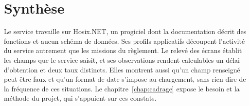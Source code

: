 \section*{Synthèse}

Le service travaille sur Hosix.NET, un progiciel dont la documentation décrit des fonctions et aucun
schéma de données. Ses  profils applicatifs découpent l'activité du service autrement que les
missions du règlement. Le relevé des écrans établit les champs que le service saisit, et ses
observations rendent calculables un délai d'obtention et deux taux distincts. Elles montrent aussi
qu'un champ renseigné peut être faux et qu'un format de date s'impose au chargement, sans rien dire
de la fréquence de ces situations. Le chapitre~\ref{chap:cadrage} expose le besoin et la méthode
du projet, qui s'appuient sur ces constats.
